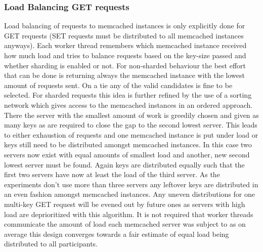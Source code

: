     \subsubsection{Load Balancing GET requests}
        Load balancing of requests to memcached instances is only explicitly done for GET requests (SET requests must be
        distributed to all memcached instances anyways). Each worker thread remembers which memcached instance received
        how much load and tries to balance requests based on the key-size passed and whether sharding is enabled or not.
        For non-sharded behaviour the best effort that can be done is returning always the memcached instance with the
        lowest amount of requests sent. On a tie any of the valid candidates is fine to be selected. For sharded
        requests this idea is further refined by the use of a sorting network which gives access to the memcached
        instances in an ordered approach. There the server with the smallest amount of work is greedily chosen and given
        as many keys as are required to close the gap to the second lowest server. This leads to either exhaustion of
        requests and one memcached instance is put under load or keys still need to be distributed amongst memcached
        instances. In this case two servers now exist with equal amounts of smallest load and another, new second lowest
        server must be found. Again keys are distributed equally such that the first two servers have now at least the
        load of the third server. As the experiments don't use more than three servers any leftover keys are distributed
        in an even fashion amongst memcached instances. Any uneven distributions for one multi-key GET request will be
        evened out by future ones as servers with high load are deprioritized with this algorithm. It is not required
        that worker threads communicate the amount of load each memcached server was subject to as on average this
        design converges towards a fair estimate of equal load being distributed to all participants.


